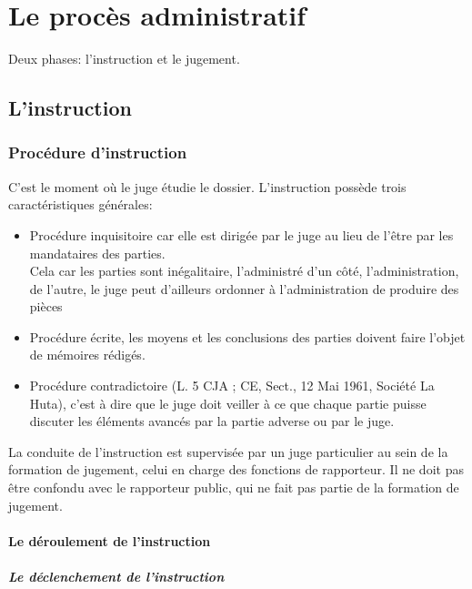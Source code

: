 \documentclass[10pt, a4paper, openany]{book}
\begin{document}
\part{Le procès administratif}

Deux phases: l'instruction et le jugement. 

\chapter{L'instruction}

\section{Procédure d'instruction}

C'est le moment où le juge étudie le dossier. L'instruction possède trois caractéristiques générales: \\
\begin{itemize}
\item Procédure inquisitoire car elle est dirigée par le juge au lieu de l'être par les mandataires des parties. \\
Cela car les parties sont inégalitaire, l'administré d'un côté, l'administration, de l'autre, le juge peut d'ailleurs ordonner à l'administration de produire des pièces
\item Procédure écrite, les moyens et les conclusions des parties doivent faire l'objet de mémoires rédigés.
\item Procédure contradictoire (L. 5 CJA ; CE, Sect., 12 Mai 1961, Société La Huta), c'est à dire que le juge doit veiller à ce que chaque partie puisse discuter les éléments avancés par la partie adverse ou par le juge. 
\end{itemize}


La conduite de l'instruction est supervisée par un juge particulier au sein de la formation de jugement, celui en charge des fonctions de rapporteur. Il ne doit pas être confondu avec le rapporteur public, qui ne fait pas partie de la formation de jugement. 

\subsection{Le déroulement de l'instruction}

\subsubsection{Le déclenchement de l'instruction}
\end{document}
